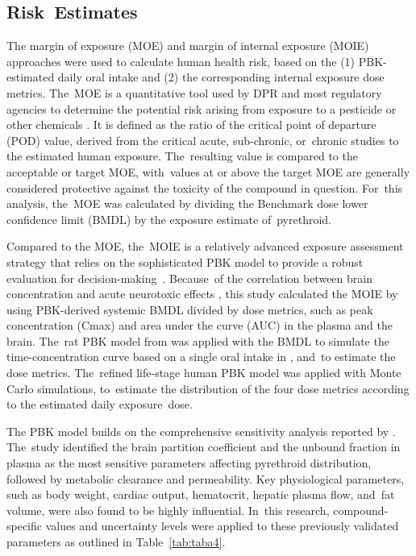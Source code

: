 \documentclass[toxics,article,accept,pdftex,moreauthors]{Definitions/mdpi}
\begin{document}
\subsection{Risk~Estimates}\label{risk-estimates}

The margin of exposure (MOE) and margin of internal exposure (MOIE) approaches
were used to calculate human health risk, based on the (1) PBK-estimated daily
oral intake and (2) the corresponding internal exposure dose metrics. The~MOE
is a quantitative tool used by DPR and most regulatory agencies to determine
the potential risk arising from exposure to a pesticide or other chemicals
\citep{beaudouin2010stochastic, beauvais_human_2010}. It is defined as the
ratio of the critical point of departure (POD) value, derived from the critical
acute, sub-chronic, or~chronic studies to the estimated human exposure. The~resulting value is compared to the acceptable or target MOE, with~values at or
above the target MOE are generally considered protective against the toxicity
of the compound in question. For~this analysis, the~MOE was calculated by
dividing the Benchmark dose lower confidence limit (BMDL) by the exposure
estimate of~pyrethroid.

Compared to the MOE, the~MOIE is a relatively advanced exposure assessment
strategy that relies on the sophisticated PBK model to provide a robust
evaluation for decision-making~\citep{bessems_margin_2017}. Because~of the
correlation between brain concentration and acute neurotoxic effects
\citep{scollon_correlation_2011}, this study calculated the MOIE by using PBK-derived
systemic BMDL divided by dose metrics, such as peak concentration (Cmax) and
area under the curve (AUC) in the plasma and the brain. The~rat PBK model from
\citet{song2019evaluation} was applied with the BMDL to simulate the
time-concentration curve based on a single oral intake in
\citet{wolansky_relative_2006}, and~to estimate the dose metrics. The~refined
life-stage human PBK model was applied with Monte Carlo simulations, to~estimate the distribution of the four dose metrics according to the estimated
daily exposure~dose. 

The PBK model builds on the comprehensive sensitivity analysis reported by\linebreak
\citet{mallick2020development}. The~study identified the brain partition
coefficient and the unbound fraction in plasma as the most sensitive parameters
affecting pyrethroid distribution, followed by metabolic clearance and
permeability. Key physiological parameters, such as body weight, cardiac
output, hematocrit, hepatic plasma flow, and~fat volume, were also found to be
highly influential. In~this research, compound-specific values and uncertainty 
levels were applied to these previously validated parameters as
outlined in Table~\ref{tab:taba4}.
\end{document}
